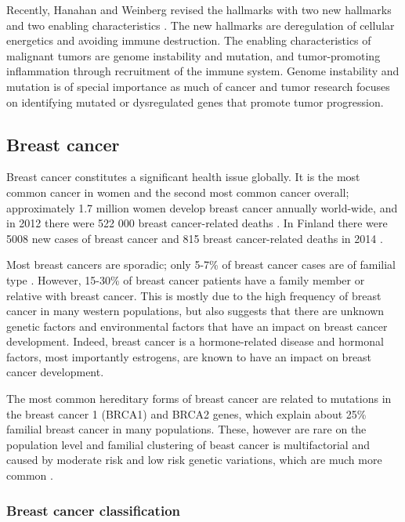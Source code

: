 Recently, Hanahan and Weinberg revised the hallmarks with two new
hallmarks and two enabling characteristics \citep{Hanahan2011}. The new
hallmarks are deregulation of cellular energetics and avoiding immune
destruction. The enabling characteristics of malignant tumors are genome
instability and mutation, and tumor-promoting inflammation through recruitment
of the immune system. Genome instability and mutation is of special importance
as much of cancer and tumor research focuses on identifying mutated or
dysregulated genes that promote tumor progression.




\subsection{Breast cancer}\label{breast-cancer}

Breast cancer constitutes a significant health issue globally. It is the most
common cancer in women and the second most common cancer overall;
approximately 1.7 million women develop breast cancer annually world-wide, and
in 2012 there were 522 000 breast cancer-related deaths
\citep{Ferlay2015}. In Finland there were 5008 new cases of breast cancer
and 815 breast cancer-related deaths in 2014 \citep{Syoparekisteri}.

Most breast cancers are sporadic; only 5-7\% of breast cancer cases are of
familial type \citep{Melchor2013}. However, 15-30\% of breast cancer patients
have a family member or relative with breast cancer. This is
mostly due to the high frequency of breast cancer in many western populations,
but also suggests that there are unknown genetic factors and environmental
factors that have an impact on breast cancer development. Indeed, breast
cancer is a hormone-related disease and hormonal factors, most importantly estrogens,
are known to have an impact on breast cancer development.

The most common hereditary forms of breast cancer are related to mutations in
the breast cancer 1 (BRCA1) and BRCA2 genes, which explain about 25\% familial
breast cancer in many populations. These, however are rare on the population
level and familial clustering of beast cancer is multifactorial and caused by
moderate risk and low risk genetic variations, which are much more common
\citep{Melchor2013}.




\subsubsection{Breast cancer classification}\label{breast-cancer-classification}

